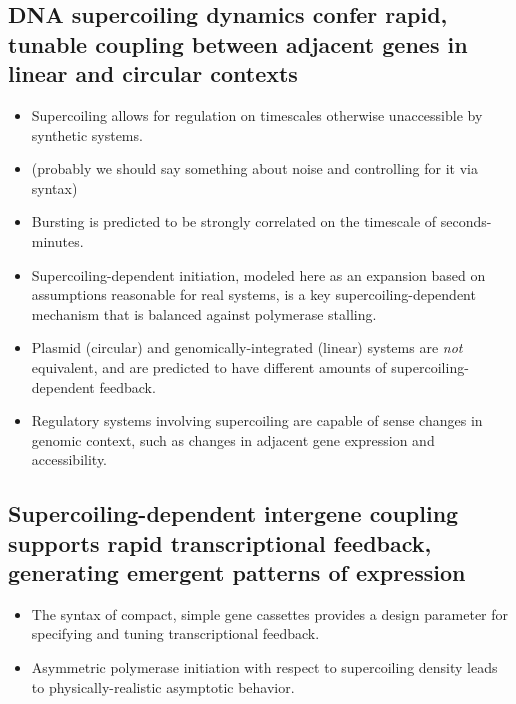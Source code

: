 \documentclass[11pt]{article}
\begin{document}
\subsection{ DNA supercoiling dynamics confer rapid, tunable coupling between adjacent genes in linear and circular contexts }
\begin{itemize}
    \item Supercoiling allows for regulation on timescales otherwise unaccessible by synthetic systems. 
    
    \item (probably we should say something about noise and controlling for it via syntax)
     
    \item Bursting is predicted to be strongly correlated on the timescale of seconds-minutes.

    \item Supercoiling-dependent initiation, modeled here as an expansion based on assumptions reasonable for real systems, is a key supercoiling-dependent mechanism that is balanced against polymerase stalling.
    
    \item Plasmid (circular) and genomically-integrated (linear) systems are \emph{not} equivalent, and are predicted to have different amounts of supercoiling-dependent feedback.
    
    \item Regulatory systems involving supercoiling are capable of sense changes in genomic context, such as changes in adjacent gene expression and accessibility.
\end{itemize}



\subsection{Supercoiling-dependent intergene coupling supports rapid  transcriptional feedback, generating emergent patterns of expression}
\begin{itemize}
    \item The syntax of compact, simple gene cassettes provides a design parameter for specifying and tuning transcriptional feedback.

    \item Asymmetric polymerase initiation with respect to supercoiling density leads to physically-realistic asymptotic behavior.
\end{itemize}
\end{document}
